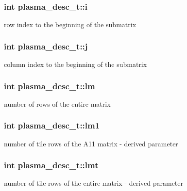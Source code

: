 \subsubsection[{i}]{\setlength{\rightskip}{0pt plus 5cm}int plasma\+\_\+desc\+\_\+t\+::i}\label{structplasma__desc__t_a7508194cedb3083d9152c4e2f957dc88_a7508194cedb3083d9152c4e2f957dc88}
row index to the beginning of the submatrix \hypertarget{structplasma__desc__t_a1d5e8aa30ce545ac2d9c2e75e201e976_a1d5e8aa30ce545ac2d9c2e75e201e976}{}
\subsubsection[{j}]{\setlength{\rightskip}{0pt plus 5cm}int plasma\+\_\+desc\+\_\+t\+::j}\label{structplasma__desc__t_a1d5e8aa30ce545ac2d9c2e75e201e976_a1d5e8aa30ce545ac2d9c2e75e201e976}
column index to the beginning of the submatrix \hypertarget{structplasma__desc__t_a20df9ed35d79a68537e991794ed16c1f_a20df9ed35d79a68537e991794ed16c1f}{}
\subsubsection[{lm}]{\setlength{\rightskip}{0pt plus 5cm}int plasma\+\_\+desc\+\_\+t\+::lm}\label{structplasma__desc__t_a20df9ed35d79a68537e991794ed16c1f_a20df9ed35d79a68537e991794ed16c1f}
number of rows of the entire matrix \hypertarget{structplasma__desc__t_abcef9d7944f3e6a79a1140389a5c887d_abcef9d7944f3e6a79a1140389a5c887d}{}
\subsubsection[{lm1}]{\setlength{\rightskip}{0pt plus 5cm}int plasma\+\_\+desc\+\_\+t\+::lm1}\label{structplasma__desc__t_abcef9d7944f3e6a79a1140389a5c887d_abcef9d7944f3e6a79a1140389a5c887d}
number of tile rows of the A11 matrix -\/ derived parameter \hypertarget{structplasma__desc__t_a6c43b11d26b88311906eab54db5d1ad2_a6c43b11d26b88311906eab54db5d1ad2}{}
\subsubsection[{lmt}]{\setlength{\rightskip}{0pt plus 5cm}int plasma\+\_\+desc\+\_\+t\+::lmt}\label{structplasma__desc__t_a6c43b11d26b88311906eab54db5d1ad2_a6c43b11d26b88311906eab54db5d1ad2}
number of tile rows of the entire matrix -\/ derived parameter \hypertarget{structplasma__desc__t_a0deb48b03bc6427bdd3770aeea1d5f36_a0deb48b03bc6427bdd3770aeea1d5f36}{}
